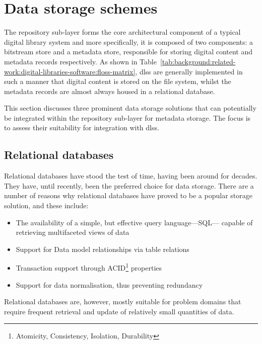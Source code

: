 \section{Data storage schemes}
\label{sec:background:data-storage-architectures}

The repository sub-layer forms the core architectural component of a typical
digital library system and more specifically, it is composed of two components:
a bitstream store and a metadata store, responsible for storing digital content
and metadata records respectively. As shown in Table~\ref{tab:background:related-work:digital-libraries-software:floss-matrix},
\glspl{dls} are generally implemented in such a manner that digital
content is stored on the file system, whilst the metadata records are almost
always housed in a relational database.

This section discusses three prominent data storage solutions that can
potentially be integrated within the repository sub-layer for metadata storage.
The focus is to assess their suitability for integration with
\glspl{dls}.

\subsection{Relational databases}
\label{sec:background:data-storage-architectures:relational-databases}

Relational databases have stood the test of time, having been around for
decades. They have, until recently, been the preferred choice for data
storage. There are a number of reasons \citep[see][chap. 3]{Elmasri2008} why relational databases have proved to
be a popular storage solution, and these include:

\begin{itemize}
 \item The availability of a simple, but effective query language---SQL---
capable of retrieving multifaceted views of data
 \item Support for Data model relationships via table relations
 \item Transaction support through ACID\footnote{Atomicity, Consistency, Isolation, Durability} properties
 \item Support for data normalisation, thus preventing redundancy
\end{itemize}

Relational databases are, however, mostly suitable for problem domains
that require frequent retrieval and update of relatively small quantities of
data.

